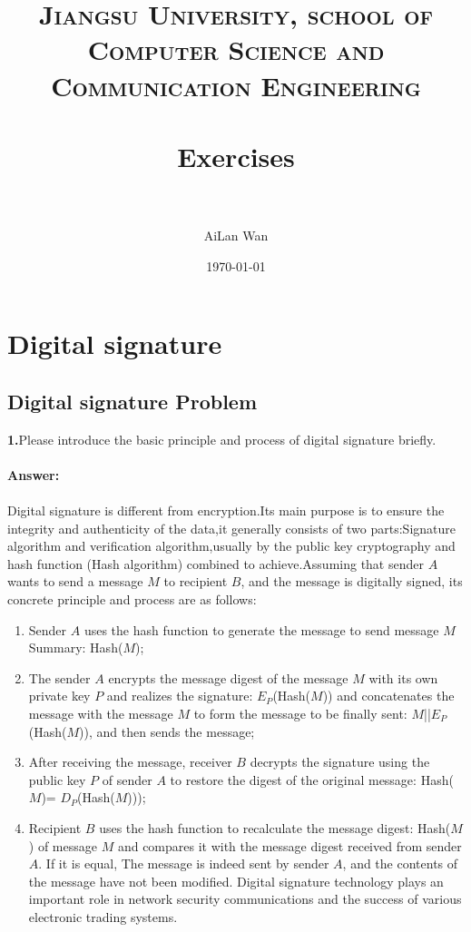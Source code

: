 \documentclass[paper=a4, fontsize=11pt]{scrartcl} %
\title{
\normalfont \normalsize
\textsc{Jiangsu University, school of Computer Science and Communication Engineering} \\ [25pt] %
\horrule{0.5pt} \\[0.4cm] %
\huge Exercises \\ %
\horrule{2pt} \\[0.5cm] %
}
\author{AiLan Wan} %
\date{\normalsize\today} %
\numberwithin{equation}{section} %
\numberwithin{figure}{section} %
\numberwithin{table}{section} %
\begin{document}
\maketitle %
\section{Digital signature}
\label{sec:ds}
\subsection{Digital signature Problem \uppercase\expandafter{}}

\textbf{1.}Please introduce the basic principle and process of digital signature briefly.
\\
\\
\textbf{Answer:}
\\
\\
Digital signature is different from encryption.Its main purpose is to ensure the integrity and authenticity of the data,it generally consists of two parts:Signature algorithm and verification algorithm,usually by the public key cryptography and hash function (Hash algorithm) combined to achieve.Assuming that sender $A$ wants to send a message $M$ to recipient $B$, and the message is digitally signed, its concrete principle and process are as follows:
\begin{enumerate}
\item Sender $A$ uses the hash function to generate the message to send message $M$ Summary: Hash($M$);
\item The sender $A$ encrypts the message digest of the message $M$ with its own private key $P$ and realizes the signature: $E_P$(Hash($M$)) and concatenates the message with the message $M$ to form the message to be finally sent: $M$||$E_P$(Hash($M$)), and then sends the message;
\item After receiving the message, receiver $B$ decrypts the signature using the public key $P$ of sender $A$ to restore the digest of the original message: Hash($M$)= $D_P$(Hash($M$)));
\item Recipient $B$ uses the hash function to recalculate the message digest: Hash($M$) of message $M$ and compares it with the message digest received from sender $A$. If it is equal, The message is indeed sent by sender $A$, and the contents of the message have not been modified. Digital signature technology plays an important role in network security communications and the success of various electronic trading systems.
\end{enumerate}
\end{document}
